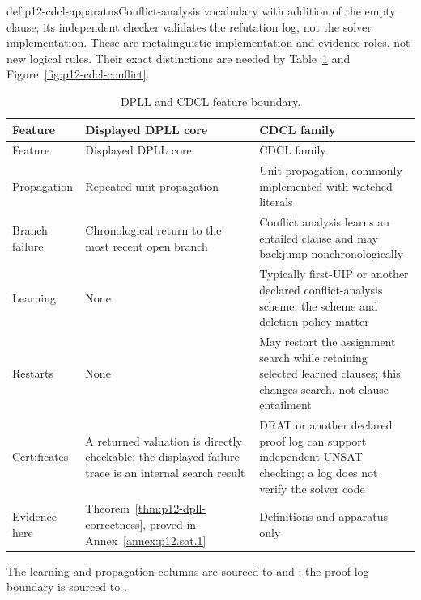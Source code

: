 \begin{hbdefinition}{def:p12-cdcl-apparatus}{Conflict-analysis vocabulary}
with addition of the empty clause; its independent checker validates the
refutation log, not the solver implementation.  These are metalinguistic
implementation and evidence roles, not new logical rules.  Their exact
distinctions are needed by
Table~\ref{tab:p12-dpll-cdcl} and Figure~\ref{fig:p12-cdcl-conflict}.
%
\end{hbdefinition}

\begin{longtable}{@{}p{}p{}p{}@{}}
\caption{DPLL and CDCL feature boundary.}
\label{tab:p12-dpll-cdcl}\\
\toprule
Feature & Displayed DPLL core & CDCL family \\ \midrule
\endfirsthead
\toprule
Feature & Displayed DPLL core & CDCL family \\ \midrule
\endhead
Propagation & Repeated unit propagation & Unit propagation, commonly
implemented with watched literals \\ \addlinespace
Branch failure & Chronological return to the most recent open branch &
Conflict analysis learns an entailed clause and may backjump
nonchronologically \\ \addlinespace
Learning & None & Typically first-UIP or another declared conflict-analysis
scheme; the scheme and deletion policy matter \\ \addlinespace
Restarts & None & May restart the assignment search while retaining selected
learned clauses; this changes search, not clause entailment \\ \addlinespace
Certificates & A returned valuation is directly checkable; the displayed
failure trace is an internal search result & DRAT or another declared proof log
can support independent UNSAT checking; a log does not verify the solver code \\
\addlinespace
Evidence here & Theorem~\ref{thm:p12-dpll-correctness}, proved in
Annex~\ref{annex:p12.sat.1} & Definitions and apparatus only \\
\bottomrule
\end{longtable}
The learning and propagation columns are sourced to
\cite{MarquesSilvaSakallah1999,MoskewiczEtAl2001} and
\cite{EenSorensson2003,MarquesSilvaLynceMalik2009}; the proof-log boundary is
sourced to \cite{WetzlerHeuleHunt2014}.

